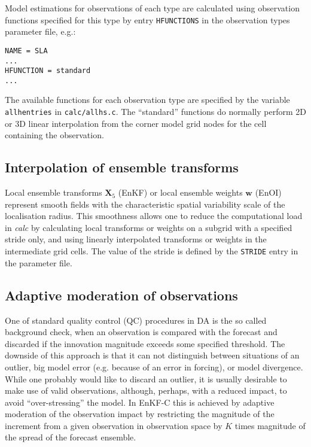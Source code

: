 \documentclass[11pt]{report}
\newcommand{\mb} {\mathbf}
\begin{document}
Model estimations for observations of each type are calculated using observation functions specified for this type by entry \verb|HFUNCTIONS| in the observation types parameter file, e.g.:
\begin{Verbatim}[frame=single,fontsize=\footnotesize]
NAME = SLA
...
HFUNCTION = standard
...
\end{Verbatim}
The available functions for each observation type are specified by the variable \verb|allhentries| in \verb|calc/allhs.c|.
The ``standard'' functions do normally perform 2D or 3D linear interpolation from the corner model grid nodes for the cell containing the observation.

\subsection{Interpolation of ensemble transforms}

Local ensemble transforms $\mb X_5$ (EnKF) or local ensemble weights $\mb w$ (EnOI) represent smooth fields with the characteristic spatial variability scale of the localisation radius.
This smoothness allows one to reduce the computational load in \emph{calc} by calculating local transforms or weights on a subgrid with a specified stride only, and using linearly interpolated transforms or weights in the intermediate grid cells.
The value of the stride is defined by the \verb|STRIDE| entry in the parameter file.

\subsection{Adaptive moderation of observations}

One of standard quality control (QC) procedures in DA is the so called background check, when an observation is compared with the forecast and discarded if the innovation magnitude exceeds some specified threshold.
The downside of this approach is that it can not distinguish between situations of an outlier, big model error (e.g. because of an error in forcing), or model divergence.
While one probably would like to discard an outlier, it is usually desirable to make use of valid observations, although, perhaps, with a reduced impact, to avoid ``over-stressing'' the model.
In EnKF-C this is achieved by adaptive moderation of the observation impact by restricting the magnitude of the increment from a given observation in observation space by $K$ times magnitude of the spread of the forecast ensemble.
\end{document}
